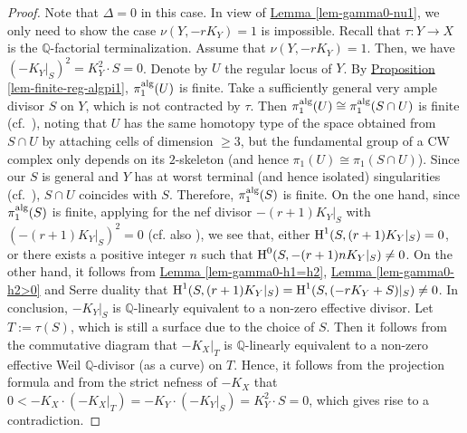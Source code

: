 \begin{proof}
Note that $\Delta=0$ in this case. 
In view of {\hyperref[lem-gamma0-nu1]{Lemma  \ref*{lem-gamma0-nu1}}}, we only need to show the case $\nu(Y,-rK_Y)=1$ is impossible.
Recall that $\tau:Y\to X$ is the $\mathbb{Q}$-factorial terminalization. 
Assume that  $\nu(Y,-rK_Y)=1$. 
Then, we have $(-K_Y|_S)^2=K_Y^2\cdot S=0$.
Denote by $U$ the regular locus of $Y$.
By {\hyperref[lem-finite-reg-algpi1]{Proposition   \ref*{lem-finite-reg-algpi1}}}, $\pi_1^{\textup{alg}}(U)$ is finite.
Take a sufficiently general very ample divisor $S$ on $Y$, which is not contracted by $\tau$. 
Then $\pi_1^{\textup{alg}}(U)\cong\pi_1^{\textup{alg}}(S\cap U)$ is finite (cf.~\cite[Theorem 1.1.3]{HL85}), noting that $U$ has the same homotopy type of the space obtained from $S\cap U$ by attaching cells of dimension $\ge 3$, but the fundamental group of a CW complex only depends on its $2$-skeleton (and hence $\pi_1(U)\cong\pi_1(S\cap U)$).
Since our $S$ is general and $Y$ has at worst terminal (and hence isolated) singularities (cf.~\cite[Corollary 5.18]{KM98}), $S\cap U$ coincides with $S$.
Therefore, $\pi_1^{\textup{alg}}(S)$ is finite.
On the one hand, since $\pi_1^{\textup{alg}}(S)$ is finite, applying \cite{Miy88} for the nef divisor $-(r+1)K_Y|_S$ with $(-(r+1)K_Y|_S)^2=0$ (cf. also \cite[Theorem 3.6]{Ser95}), we see that, either $\operatorname{H}^1(S,(r+1)K_Y|_S)=0$, or there exists a positive integer $n$ such that $\operatorname{H}^0(S,-(r+1)nK_Y|_S)\neq 0$.
On the other hand, it follows from {\hyperref[lem-gamma0-h1=h2]{Lemma  \ref*{lem-gamma0-h1=h2}}}, {\hyperref[lem-gamma0-h2>0]{Lemma  \ref*{lem-gamma0-h2>0}}} and Serre duality that
$\operatorname{H}^1(S,(r+1)K_Y|_S)=\operatorname{H}^1(S,(-rK_Y+S)|_S)\neq 0$.
In conclusion,  $-K_Y|_S$ is $\mathbb{Q}$-linearly equivalent to a non-zero effective divisor.
Let $T:=\tau(S)$, which is still a surface due to the choice of $S$. 
Then it follows from the commutative diagram that $-K_X|_T$ is $\mathbb{Q}$-linearly equivalent to a non-zero effective Weil $\mathbb{Q}$-divisor (as a curve) on $T$. 
Hence, it follows from the projection formula and from the strict nefness of $-K_X$ that $0<-K_X\cdot (-K_X|_T)=-K_Y\cdot (-K_Y|_S)=K_Y^2\cdot S=0$, which gives rise to a contradiction.
\end{proof}


